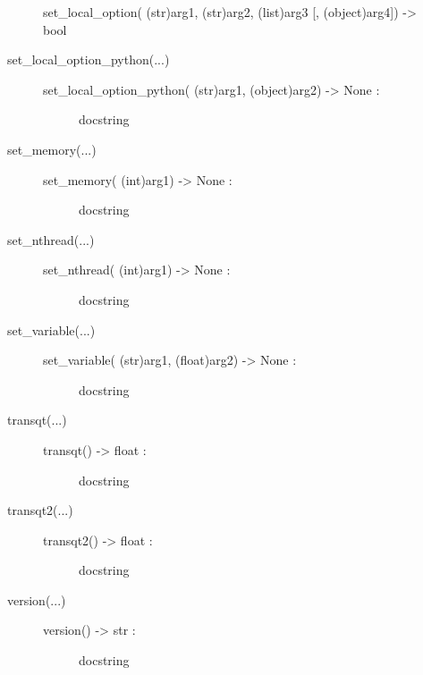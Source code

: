 \documentclass[letterpaper,10pt,english]{sphinxmanual}
\begin{document}
\begin{description}
\begin{description}
set\_local\_option( (str)arg1, (str)arg2, (list)arg3 {[}, (object)arg4{]}) -\textgreater{} bool

\item[{set\_local\_option\_python(...)}] \leavevmode\begin{description}
\item[{set\_local\_option\_python( (str)arg1, (object)arg2) -\textgreater{} None :}] \leavevmode
docstring

\end{description}

\item[{set\_memory(...)}] \leavevmode\begin{description}
\item[{set\_memory( (int)arg1) -\textgreater{} None :}] \leavevmode
docstring

\end{description}

\item[{set\_nthread(...)}] \leavevmode\begin{description}
\item[{set\_nthread( (int)arg1) -\textgreater{} None :}] \leavevmode
docstring

\end{description}

\item[{set\_variable(...)}] \leavevmode\begin{description}
\item[{set\_variable( (str)arg1, (float)arg2) -\textgreater{} None :}] \leavevmode
docstring

\end{description}

\item[{transqt(...)}] \leavevmode\begin{description}
\item[{transqt() -\textgreater{} float :}] \leavevmode
docstring

\end{description}

\item[{transqt2(...)}] \leavevmode\begin{description}
\item[{transqt2() -\textgreater{} float :}] \leavevmode
docstring

\end{description}

\item[{version(...)}] \leavevmode\begin{description}
\item[{version() -\textgreater{} str :}] \leavevmode
docstring


\end{description}
\end{description}
\end{description}
\end{document}

